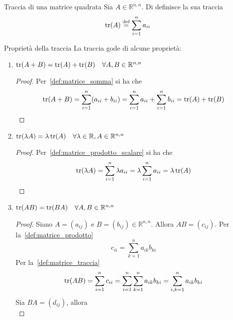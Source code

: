 \begin{Def}{Traccia di una matrice quadrata}\label{def:matrice_traccia}
  Sia $A\in\mathbb{R}^{n,n}$. Di definisce la sua traccia
  \begin{equation*}
    \tr(A)\overset{\text{def}}{=}\sum_{i=1}^{n}a_{ii}
  \end{equation*}
\end{Def}

\begin{SubDef}{Proprietà della traccia}
  La traccia gode di alcune proprietà:
  \begin{enumerate}
    \item $\tr(A+B) = \tr(A) + \tr(B)\quad\forall A,B\in\mathbb{R}^{n,n}$
      \begin{proof}
        Per~\autoref{def:matrice_somma} si ha che
        \begin{equation*}
          \tr(A+B) = \sum^{n}_{i=1} (a_{ii}+b_{ii}) = \sum^{n}_{i=1} a_{ii} +
          \sum^{n}_{i=1} b_{ii} = \tr(A) + \tr(B)
        \end{equation*}
      \end{proof}
    \item $\tr(\lambda A) = \lambda\tr(A)\quad\forall\lambda\in\mathbb{R},
      A\in\mathbb{R}^{n,n}$
      \begin{proof}
        Per~\autoref{def:matrice_prodotto_scalare} si ha che
        \begin{equation*}
          \tr(\lambda A) = \sum^{n}_{i=1} \lambda a_{ii} = \lambda \sum^{n}_{i=1} a_{ii}
          = \lambda\tr(A)
        \end{equation*}
      \end{proof}
    \item $\tr(AB) = \tr(BA)\quad\forall A,B\in\mathbb{R}^{n,n}$
      \begin{proof}
        Siano $A=(a_{ij})$ e $B=(b_{ij})\in\mathbb{R}^{n,n}$. Allora $AB=(c_{ij})$. Per
        la~\autoref{def:matrice_prodotto}
        \begin{equation*}
          c_{ii} = \sum^{n}_{k=1} a_{ik}b_{ki}
        \end{equation*}
        Per la~\autoref{def:matrice_traccia}
        \begin{equation}\label{eq:matrice_traccia_3_dim_1}
          \tr(AB) = \sum^{n}_{i=1} c_{ii}= \sum^{n}_{i=1} \sum^{n}_{k=1} a_{ik}b_{ki}=
          \sum^{n}_{i,k=1} a_{ik}b_{ki}
        \end{equation}
        Sia $BA = (d_{ij})$, allora
        \begin{equation*}

\end{equation*}
\end{proof}
\end{enumerate}
\end{SubDef}
